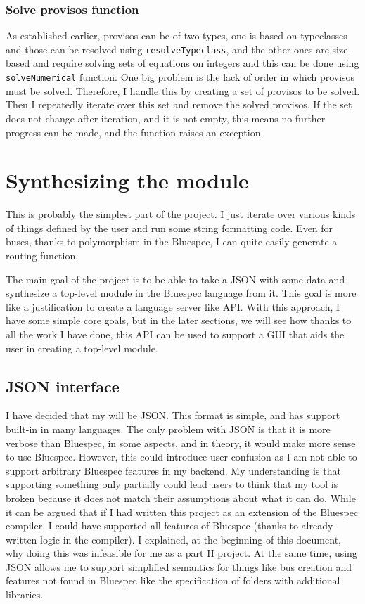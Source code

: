 \documentclass[12pt]{report}
\begin{document}
\subsubsection{Solve provisos function} 
As established earlier, provisos can be of two types, one is based on typeclasses and those can be resolved using \verb!resolveTypeclass!, and the other ones are size-based and require solving sets of equations on integers and this can be done using \verb!solveNumerical! function. 
One big problem is the lack of order in which provisos must be solved. Therefore, I handle this by creating a set of provisos to be solved. Then I repeatedly iterate over this set and remove the solved provisos. If the set does not change after iteration, and it is not empty, this means no further progress can be made, and the function raises an exception. 


\section{Synthesizing the module}
This is probably the simplest part of the project. I just iterate over various kinds of things defined by the user and run some string formatting code. Even for buses, thanks to polymorphism in the Bluespec, I can quite easily generate a routing function. 
  
  
The main goal of the project is to be able to take a JSON with some data and synthesize a top-level module in the Bluespec language from it. This goal is more like a justification to create a language server like API. With this approach, I have some simple core goals, but in the later sections, we will see how thanks to all the work I have done, this API can be used to support a GUI that aids the user in creating a top-level module.
  
\subsection{JSON interface}
I have decided that my  will be JSON. This format is simple, and has support built-in in many languages.
The only problem with JSON is that it is more verbose than Bluespec, in some aspects, and in theory, it would make more sense to use Bluespec.
However, this could introduce user confusion as I am not able to support arbitrary Bluespec features in my backend.
My understanding is that supporting something only partially could lead users to think that my tool is broken because it does not match their assumptions about what it can do.
While it can be argued that if I had written this project as an extension of the Bluespec compiler, I could have supported all features of Bluespec (thanks to already written logic in the compiler).
I explained, at the beginning of this document, why doing this was infeasible for me as a part II project.
At the same time, using JSON allows me to support simplified semantics for things like bus creation and features not found in Bluespec like the specification of folders with additional libraries.
\end{document}
